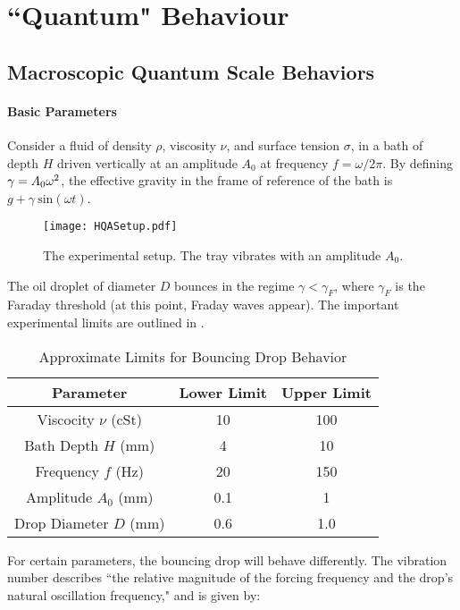 \chapter{``Quantum" Behaviour}

\section{Macroscopic Quantum Scale Behaviors} 
	    \subsubsection{Basic Parameters}
	       Consider a fluid of density $\rho$, viscosity $\nu$, and surface tension $\sigma$, in a bath of depth $H$ driven vertically at an amplitude $A_0$ at frequency $f=\omega/{2\pi}$. By defining $\mathnormal{\gamma}=A_0\omega^2$, the effective gravity in the frame of reference of the bath is $g+\gamma~\mathrm{sin}(\omega t)$. 
	       
	   \begin{figure}[h]
	       \centering
	    \texttt{[image: HQASetup.pdf]}
	     \caption{The experimental setup. The tray vibrates with an amplitude $A_0$.}
	 \label{regime}
	\end{figure}
	       
	       The oil droplet of diameter $D$ bounces in the regime $\gamma<\gamma_F$, where $\gamma_F$ is the Faraday threshold (at this point, Fraday waves appear). The important experimental limits are outlined in . 
	       \begin{table}[htdp] 
\caption[Basic Table 1]{Approximate Limits for Bouncing Drop Behavior} 
\begin{center} 
\begin{tabular}{c c c} 
\toprule 
  Parameter &  Lower Limit & Upper Limit \\
  \midrule
Viscocity $\nu$ (cSt) & 10 & 100 \\ 
Bath Depth $H$ (mm) & 4 & 10 \\
Frequency $f$ (Hz) & 20 & 150 \\
Amplitude $A_0$ (mm) & 0.1 & 1 \\
Drop Diameter $D$ (mm) & 0.6 & 1.0 \\
\bottomrule 
\end{tabular}
\end{center}
\label{approxlimits} 
\end{table}	

For certain parameters, the bouncing drop will behave differently. The vibration number describes ``the relative magnitude of the forcing frequency and the drop's natural oscillation frequency," and is given by:
	       	      

